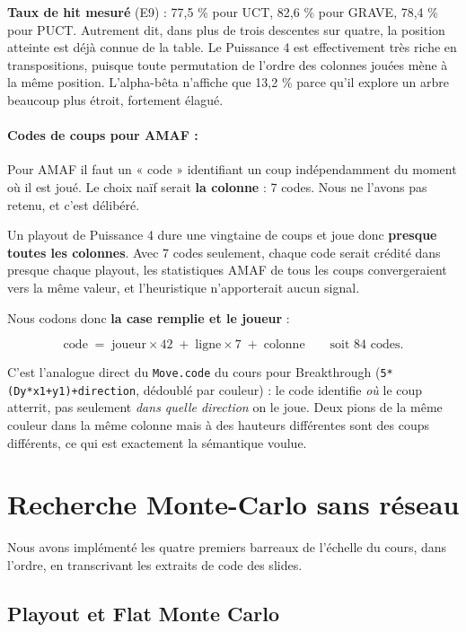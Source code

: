 \documentclass[11pt,a4paper]{article}
\begin{document}
\textbf{Taux de hit mesuré} (E9) : 77,5 \% pour UCT, 82,6 \% pour GRAVE, 78,4 \% pour
PUCT. Autrement dit, dans plus de trois descentes sur quatre, la position
atteinte est déjà connue de la table. Le Puissance 4 est effectivement très riche
en transpositions, puisque toute permutation de l'ordre des colonnes jouées mène
à la même position. L'alpha-bêta n'affiche que 13,2 \% parce qu'il explore un
arbre beaucoup plus étroit, fortement élagué.

\paragraph{Codes de coups pour AMAF :}

Pour AMAF il faut un « code » identifiant un coup indépendamment du moment où il
est joué. Le choix naïf serait \textbf{la colonne} : 7 codes. Nous ne l'avons pas
retenu, et c'est délibéré.

Un playout de Puissance 4 dure une vingtaine de coups et joue donc \textbf{presque
toutes les colonnes}. Avec 7 codes seulement, chaque code serait crédité dans
presque chaque playout, les statistiques AMAF de tous les coups convergeraient
vers la même valeur, et l'heuristique n'apporterait aucun signal.

Nous codons donc \textbf{la case remplie et le joueur} :

\begin{equation*}
\mathrm{code} \;=\; \mathrm{joueur} \times 42 \;+\; \mathrm{ligne} \times 7 \;+\; \mathrm{colonne}
\qquad\text{soit } 84 \text{ codes.}
\end{equation*}

C'est l'analogue direct du \texttt{Move.code} du cours pour Breakthrough
(\texttt{5*(Dy*x1+y1)+direction}, dédoublé par couleur) : le code identifie \emph{où} le coup
atterrit, pas seulement \emph{dans quelle direction} on le joue. Deux pions de la même
couleur dans la même colonne mais à des hauteurs différentes sont des coups
différents, ce qui est exactement la sémantique voulue.

\section{Recherche Monte-Carlo sans réseau}\label{recherche-monte-carlo-sans-ruxe9seau}

Nous avons implémenté les quatre premiers barreaux de l'échelle du cours, dans
l'ordre, en transcrivant les extraits de code des slides.

\subsection{Playout et Flat Monte Carlo}\label{playout-et-flat-monte-carlo}
\end{document}
